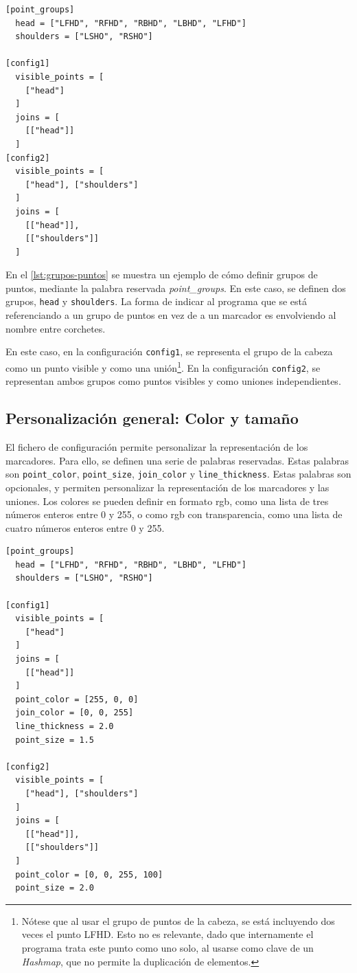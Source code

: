 \begin{lstlisting}[style=mystyle, caption={Ejemplo de un grupo de puntos}, label={lst:grupos-puntos}]
[point_groups]
  head = ["LFHD", "RFHD", "RBHD", "LBHD", "LFHD"]
  shoulders = ["LSHO", "RSHO"]

[config1]
  visible_points = [
    ["head"]
  ]
  joins = [
    [["head"]]
  ]
[config2]
  visible_points = [
    ["head"], ["shoulders"]
  ]
  joins = [
    [["head"]], 
    [["shoulders"]]
  ]
\end{lstlisting}

En el \autoref{lst:grupos-puntos} se muestra un ejemplo de cómo definir grupos de puntos, mediante la palabra reservada \textit{point\_groups}. En este caso, se definen dos grupos, \texttt{head} y \texttt{shoulders}. La forma de indicar al programa que se está referenciando a un grupo de puntos en vez de a un marcador es envolviendo al nombre entre corchetes.

En este caso, en la configuración \texttt{config1}, se representa el grupo de la cabeza como un punto visible y como una unión\footnote{Nótese que al usar el grupo de puntos de la cabeza, se está incluyendo dos veces el punto \ac{LFHD}. Esto no es relevante, dado que internamente el programa trata este punto como uno solo, al usarse como clave de un \textit{Hashmap}, que no permite la duplicación de elementos.}. En la configuración \texttt{config2}, se representan ambos grupos como puntos visibles y como uniones independientes. 

\subsection{Personalización general: Color y tamaño}

El fichero de configuración permite personalizar la representación de los marcadores. Para ello, se definen una serie de palabras reservadas. Estas palabras son \texttt{point\_color}, \texttt{point\_size}, \texttt{join\_color} y \texttt{line\_thickness}. Estas palabras son opcionales, y permiten personalizar la representación de los marcadores y las uniones. Los colores se pueden definir en formato rgb, como una lista de tres números enteros entre 0 y 255, o como rgb con transparencia, como una lista de cuatro números enteros entre 0 y 255.

\begin{lstlisting}[style=mystyle, caption={Configuración personalizada}, label={lst:cfg-personalizada}]
[point_groups]
  head = ["LFHD", "RFHD", "RBHD", "LBHD", "LFHD"]
  shoulders = ["LSHO", "RSHO"]

[config1]
  visible_points = [
    ["head"]
  ]
  joins = [
    [["head"]]
  ]
  point_color = [255, 0, 0]
  join_color = [0, 0, 255]
  line_thickness = 2.0
  point_size = 1.5

[config2]
  visible_points = [
    ["head"], ["shoulders"]
  ]
  joins = [
    [["head"]], 
    [["shoulders"]]
  ]
  point_color = [0, 0, 255, 100]
  point_size = 2.0
\end{lstlisting}

